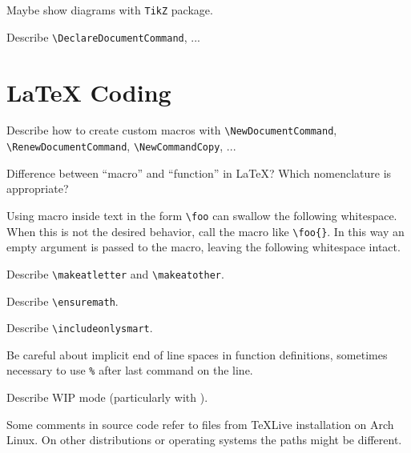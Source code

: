 \begin{Todo}
    Maybe show diagrams with \texttt{TikZ} package.
\end{Todo}
\begin{Todo}
    Describe \verb|\DeclareDocumentCommand|, ...
\end{Todo}


\section{\texorpdfstring{\LaTeX{}}{LaTeX} Coding}%
\label{sec:LaTeX Coding}

\begin{Todo}
    Describe how to create custom macros with \verb|\NewDocumentCommand|, \verb|\RenewDocumentCommand|, \verb|\NewCommandCopy|, ...
\end{Todo}
\begin{Question}
    Difference between \enquote{macro} and \enquote{function} in \LaTeX{}?
    Which nomenclature is appropriate?
\end{Question}
\begin{remark}
    Using macro inside text in the form \verb|\foo| can swallow the following whitespace.
    When this is not the desired behavior, call the macro like \verb|\foo{}|.
    In this way an empty argument is passed to the macro, leaving the following whitespace intact.
\end{remark}
\begin{Todo}
    Describe \verb|\makeatletter| and \verb|\makeatother|.
\end{Todo}
\begin{Todo}
    Describe \verb|\ensuremath|.
\end{Todo}
\begin{Todo}
    Describe \verb|\includeonlysmart|.
\end{Todo}
\begin{Note}
    Be careful about implicit end of line spaces in function definitions, sometimes necessary to use \verb|%| after last command on the line.
\end{Note}
\begin{Todo}
    Describe WIP mode (particularly with \LuaTeX{}).
\end{Todo}
\begin{Note}
    Some comments in source code refer to files from \TeX{}Live installation on Arch Linux.
    On other distributions or operating systems the paths might be different.
\end{Note}
